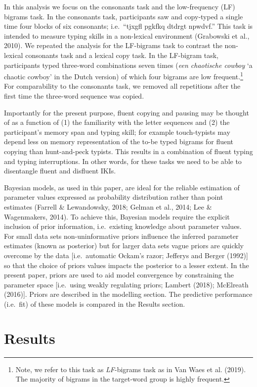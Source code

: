 \documentclass[
  english,
  man,mask,floatsintext]{apa7}
\begin{document}
In this analysis we focus on the consonants task and the low-frequency (LF) bigrams task. In the consonants task, participants saw and copy-typed a single time four blocks of six consonants; i.e.~\enquote{tjxgfl pgkfkq dtdrgt npwdvf.} This task is intended to measure typing skills in a non-lexical environment (Grabowski et al., 2010). We repeated the analysis for the LF-bigrams task to contrast the non-lexical consonants task and a lexical copy task. In the LF-bigram task, participants typed three-word combinations seven times (\emph{een chaotische cowboy} \enquote*{a chaotic cowboy} in the Dutch version) of which four bigrams are low frequent.\footnote{Note, we refer to this task as \emph{LF}-bigrams task as in Van Waes et al. (2019). The majority of bigrams in the target-word group is highly frequent.} For comparability to the consonants task, we removed all repetitions after the first time the three-word sequence was copied.

Importantly for the present purpose, fluent copying and pausing may be thought of as a function of (1) the familiarity with the letter sequences and (2) the participant's memory span and typing skill; for example touch-typists may depend less on memory representation of the to-be typed bigrams for fluent copying than hunt-and-peck typists. This results in a combination of fluent typing and typing interruptions. In other words, for these tasks we need to be able to disentangle fluent and disfluent IKIs.

Bayesian models, as used in this paper, are ideal for the reliable estimation of parameter values expressed as probability distribution rather than point estimates (Farrell \& Lewandowsky, 2018; Gelman et al., 2014; Lee \& Wagenmakers, 2014). To achieve this, Bayesian models require the explicit inclusion of prior information, i.e.~existing knowledge about parameter values. For small data sets non-uninformative priors influence the inferred parameter estimates (known as posterior) but for larger data sets vague priors are quickly overcome by the data {[}i.e.~automatic Ockam's razor; Jefferys and Berger (1992){]} so that the choice of priors values impacts the posterior to a lesser extent. In the present paper, priors are used to aid model convergence by constraining the parameter space {[}i.e.~using weakly regulating priors; Lambert (2018); McElreath (2016){]}. Priors are described in the modelling section. The predictive performance (i.e.~fit) of these models is compared in the Results section.

\hypertarget{results}{%
\section{Results}\label{results}}
\end{document}
